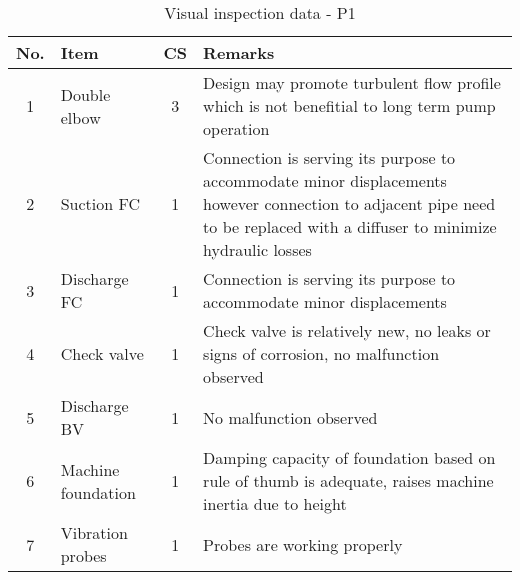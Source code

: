 \begin{table}[!htb]
	\caption{Visual inspection data - P1}
	\label{ch043_tbl_visualinspectionP1}
		{\scriptsize
\begin{tabular}{c|l|c|p{9.5cm}}
\hline
No. & Item & CS & Remarks \\ 
\hline
1 & Double elbow & 3 & Design may promote turbulent flow profile which is not benefitial to long term pump operation \\ 
2 & Suction FC & 1 & Connection is serving its purpose to accommodate minor displacements however connection to adjacent pipe need to be replaced with a diffuser to minimize hydraulic losses\\ 
3 & Discharge FC & 1 & Connection is serving its purpose to accommodate minor displacements \\ 
4 & Check valve & 1 & Check valve is relatively new, no leaks or signs of corrosion, no malfunction observed \\ 
5 & Discharge BV & 1 & No malfunction observed \\ 
6 & Machine foundation & 1 & Damping capacity of foundation based on rule of thumb is adequate, raises machine inertia due to height  \\ 
7 & Vibration probes & 1 & Probes are working properly \\ 
\hline

\end{tabular}
	}
\end{table}